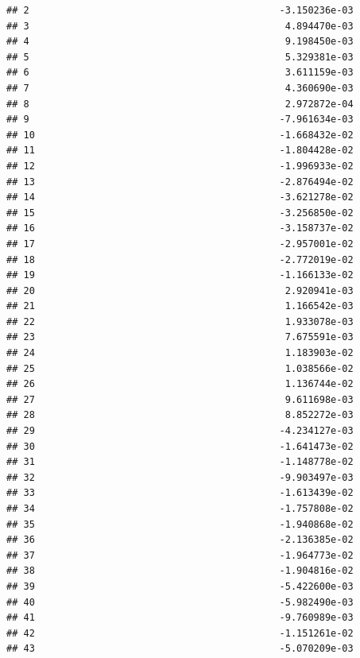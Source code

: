 \documentclass[
]{article}
\begin{document}
\begin{verbatim}
## 2                                            -3.150236e-03
## 3                                             4.894470e-03
## 4                                             9.198450e-03
## 5                                             5.329381e-03
## 6                                             3.611159e-03
## 7                                             4.360690e-03
## 8                                             2.972872e-04
## 9                                            -7.961634e-03
## 10                                           -1.668432e-02
## 11                                           -1.804428e-02
## 12                                           -1.996933e-02
## 13                                           -2.876494e-02
## 14                                           -3.621278e-02
## 15                                           -3.256850e-02
## 16                                           -3.158737e-02
## 17                                           -2.957001e-02
## 18                                           -2.772019e-02
## 19                                           -1.166133e-02
## 20                                            2.920941e-03
## 21                                            1.166542e-03
## 22                                            1.933078e-03
## 23                                            7.675591e-03
## 24                                            1.183903e-02
## 25                                            1.038566e-02
## 26                                            1.136744e-02
## 27                                            9.611698e-03
## 28                                            8.852272e-03
## 29                                           -4.234127e-03
## 30                                           -1.641473e-02
## 31                                           -1.148778e-02
## 32                                           -9.903497e-03
## 33                                           -1.613439e-02
## 34                                           -1.757808e-02
## 35                                           -1.940868e-02
## 36                                           -2.136385e-02
## 37                                           -1.964773e-02
## 38                                           -1.904816e-02
## 39                                           -5.422600e-03
## 40                                           -5.982490e-03
## 41                                           -9.760989e-03
## 42                                           -1.151261e-02
## 43                                           -5.070209e-03

\end{verbatim}
\end{document}

